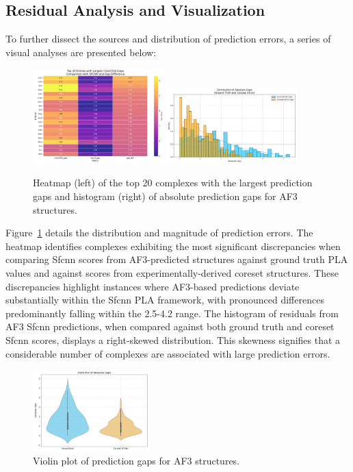 \documentclass[unnumsec,webpdf,contemporary,large]{oup-authoring-template}
\theoremstyle{thmstyleone}%
\theoremstyle{thmstyletwo}%
\theoremstyle{thmstylethree}%
\begin{document}
\subsection{Residual Analysis and Visualization}
To further dissect the sources and distribution of prediction errors, 
a series of visual analyses are presented below:

\begin{figure}[H]
    \centering
    \includegraphics[width=0.45\textwidth]{images/top20_heatmap.png}
    \includegraphics[width=0.45\textwidth]{images/gap_histogram.png}
    \caption{Heatmap (left) of the top 20 complexes with the largest prediction gaps and histogram (right) of absolute prediction gaps for AF3 structures.}
    \label{fig:af3_heatmap_hist}
\end{figure}

Figure~\ref{fig:af3_heatmap_hist} details the distribution and magnitude of prediction errors. 
The heatmap identifies complexes exhibiting the most significant discrepancies when comparing Sfcnn scores from AF3-predicted structures against ground truth PLA values and against scores from experimentally-derived coreset structures. 
These discrepancies highlight instances where AF3-based predictions deviate substantially within the Sfcnn PLA framework, with pronounced differences predominantly falling within the 2.5-4.2 range.
The histogram of residuals from AF3 Sfcnn predictions, when compared against both ground truth and coreset Sfcnn scores, displays a right-skewed distribution. 
This skewness signifies that a considerable number of complexes are associated with large prediction errors.

\begin{figure}[H]
    \centering
    \includegraphics[width=0.4\textwidth]{images/gap_violinplot.png}
    \caption{Violin plot of prediction gaps for AF3 structures.}
    \label{fig:af3_gap_violin}
\end{figure}
\end{document}
